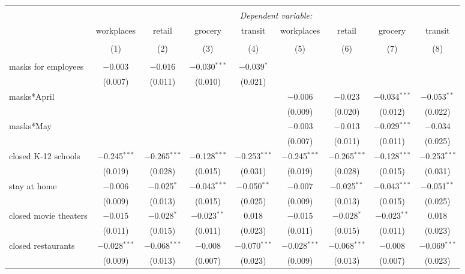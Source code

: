 \begin{tabular}{@{\extracolsep{1pt}}lcccccccc} 
\\[-1.8ex]\hline 
\hline \\[-1.8ex] 
 & \multicolumn{8}{c}{\textit{Dependent variable:}} \\ 
\cline{2-9} 
 & workplaces & retail & grocery & transit & workplaces & retail & grocery & transit \\ 
\\[-1.8ex] & (1) & (2) & (3) & (4) & (5) & (6) & (7) & (8)\\ 
\hline \\[-1.8ex] 
 masks for employees & $-$0.003 & $-$0.016 & $-$0.030$^{***}$ & $-$0.039$^{*}$ &  &  &  &  \\ 
  & (0.007) & (0.011) & (0.010) & (0.021) &  &  &  &  \\ 
  masks*April &  &  &  &  & $-$0.006 & $-$0.023 & $-$0.034$^{***}$ & $-$0.053$^{**}$ \\ 
  &  &  &  &  & (0.009) & (0.020) & (0.012) & (0.022) \\ 
  masks*May &  &  &  &  & $-$0.003 & $-$0.013 & $-$0.029$^{***}$ & $-$0.034 \\ 
  &  &  &  &  & (0.007) & (0.011) & (0.011) & (0.025) \\ 
  closed K-12 schools & $-$0.245$^{***}$ & $-$0.265$^{***}$ & $-$0.128$^{***}$ & $-$0.253$^{***}$ & $-$0.245$^{***}$ & $-$0.265$^{***}$ & $-$0.128$^{***}$ & $-$0.253$^{***}$ \\ 
  & (0.019) & (0.028) & (0.015) & (0.031) & (0.019) & (0.028) & (0.015) & (0.031) \\ 
  stay at home & $-$0.006 & $-$0.025$^{*}$ & $-$0.043$^{***}$ & $-$0.050$^{**}$ & $-$0.007 & $-$0.025$^{**}$ & $-$0.043$^{***}$ & $-$0.051$^{**}$ \\ 
  & (0.009) & (0.013) & (0.015) & (0.025) & (0.009) & (0.013) & (0.015) & (0.025) \\ 
  closed movie theaters & $-$0.015 & $-$0.028$^{*}$ & $-$0.023$^{**}$ & 0.018 & $-$0.015 & $-$0.028$^{*}$ & $-$0.023$^{**}$ & 0.018 \\ 
  & (0.011) & (0.015) & (0.011) & (0.023) & (0.011) & (0.015) & (0.011) & (0.023) \\ 
  closed restaurants & $-$0.028$^{***}$ & $-$0.068$^{***}$ & $-$0.008 & $-$0.070$^{***}$ & $-$0.028$^{***}$ & $-$0.068$^{***}$ & $-$0.008 & $-$0.069$^{***}$ \\ 
  & (0.009) & (0.013) & (0.007) & (0.023) & (0.009) & (0.013) & (0.007) & (0.023) \\ 

\end{tabular}
